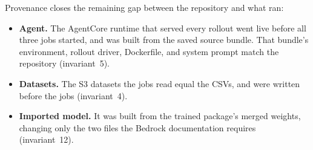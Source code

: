 \documentclass[11pt]{article}
\begin{document}
Provenance closes the remaining gap between the repository and what ran:
\begin{itemize}[leftmargin=*]
\item \textbf{Agent.} The AgentCore runtime that served every rollout went live before all three jobs
started, and was built from the saved source bundle. That bundle's environment, rollout driver, Dockerfile,
and system prompt match the repository (invariant~5).
\item \textbf{Datasets.} The S3 datasets the jobs read equal the CSVs, and were written before the jobs
(invariant~4).
\item \textbf{Imported model.} It was built from the trained package's merged weights, changing only the
two files the Bedrock documentation requires (invariant~12).
\end{itemize}

\appendix
\end{document}
